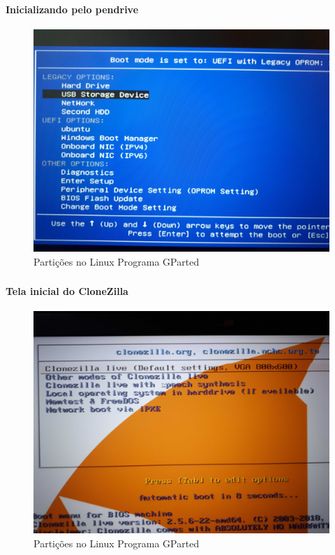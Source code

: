 \documentclass{beamer}
\begin{document}
\begin{frame}[plain,c]
   \frametitle{\insertsection}
    \framesubtitle{Inicializando pelo pendrive}
    \begin{figure}[!h]
        
        \includegraphics[width=1\linewidth]{images/backup/bkp1.jpg}
        \caption{Partições no Linux Programa GParted}
    \end{figure}
\end{frame}

\begin{frame}[plain,c]
   \frametitle{\insertsection}
    \framesubtitle{Tela inicial do CloneZilla}
    \begin{figure}[!h]
        
        \includegraphics[width=1\linewidth]{images/backup/bkp2.jpg}
        \caption{Partições no Linux Programa GParted}
    \end{figure}
\end{frame}
\end{document}
